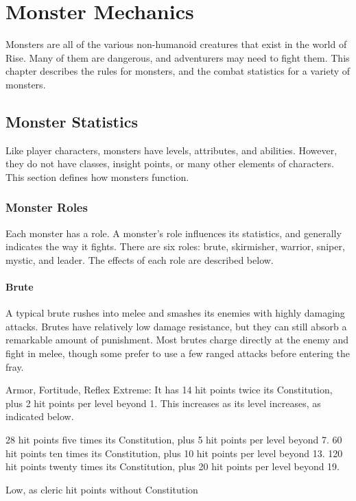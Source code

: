 \chapter{Monster Mechanics}

Monsters are all of the various non-humanoid creatures that exist in the world of Rise.
Many of them are dangerous, and adventurers may need to fight them.
This chapter describes the rules for monsters, and the combat statistics for a variety of monsters.

\section{Monster Statistics}
  Like player characters, monsters have levels, attributes, and abilities.
  However, they do not have classes, insight points, or many other elements of characters.
  This section defines how monsters function.

  \subsection{Monster Roles}
    Each monster has a role.
    A monster's role influences its statistics, and generally indicates the way it fights.
    There are six roles: brute, skirmisher, warrior, sniper, mystic, and leader.
    The effects of each role are described below.

    \subsubsection{Brute}
      A typical brute rushes into melee and smashes its enemies with highly damaging attacks.
      Brutes have relatively low damage resistance, but they can still absorb a remarkable amount of punishment.
      Most brutes charge directly at the enemy and fight in melee, though some prefer to use a few ranged attacks before entering the fray.

        Armor,  Fortitude,  Reflex
       Extreme: It has 14 hit points \add twice its Constitution, plus 2 hit points per level beyond 1.
      This increases as its level increases, as indicated below.
      \begin{itemize}
         28 hit points \add five times its Constitution, plus 5 hit points per level beyond 7.
         60 hit points \add ten times its Constitution, plus 10 hit points per level beyond 13.
         120 hit points \add twenty times its Constitution, plus 20 hit points per level beyond 19.
      \end{itemize}
       Low, as cleric hit points without Constitution

